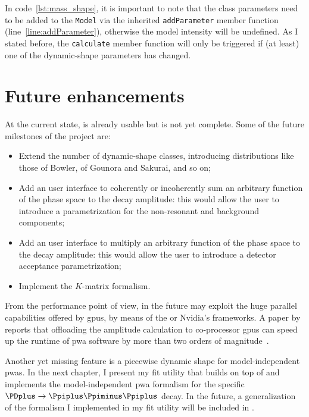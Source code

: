     
    In code~\ref{lst:mass_shape}, it is important to note that the class parameters need to be added to the \lstinline!Model! via the inherited \lstinline!addParameter! member function (line~\ref{line:addParameter}), otherwise the model intensity will be undefined.
    As I stated before, the \lstinline!calculate! member function will only be triggered if (at least) one of the dynamic-shape parameters has changed.


    \section{Future enhancements}

    At the current state,  is already usable but is not yet complete.
    Some of the future milestones of the project are:
    \begin{itemize}
        \item
            Extend the number of dynamic-shape classes, introducing distributions like those of Bowler, of Gounora and Sakurai, and so on;

        \item
            Add an user interface to coherently or incoherently sum an arbitrary function of the phase space to the decay amplitude: this would allow the user to introduce a parametrization for the non-resonant and background components;

        \item
            Add an user interface to multiply an arbitrary function of the phase space to the decay amplitude: this would allow the user to introduce a detector acceptance parametrization;

        \item
            Implement the $K$-matrix formalism.

    \end{itemize}

    From the performance point of view, in the future  may exploit the huge parallel capabilities offered by \acsp{gpu}, by means of the  or Nvidia's  frameworks.
    A paper by \citeauthor{gpu_pwa_berger} reports that offloading the amplitude calculation to co-processor \acsp{gpu} can speed up the runtime of \ac{pwa} software by more than two orders of magnitude~\cite{gpu_pwa_berger}.


    Another yet missing feature is a piecewise dynamic shape for model-independent \acp{pwa}.
    In the next chapter, I present my fit utility that builds on top of  and implements the model-independent \ac{pwa} formalism for the specific $\PDplus\to\Ppiplus\Ppiminus\Ppiplus$ decay.
    In the future, a generalization of the formalism I implemented in my fit utility will be included in .
